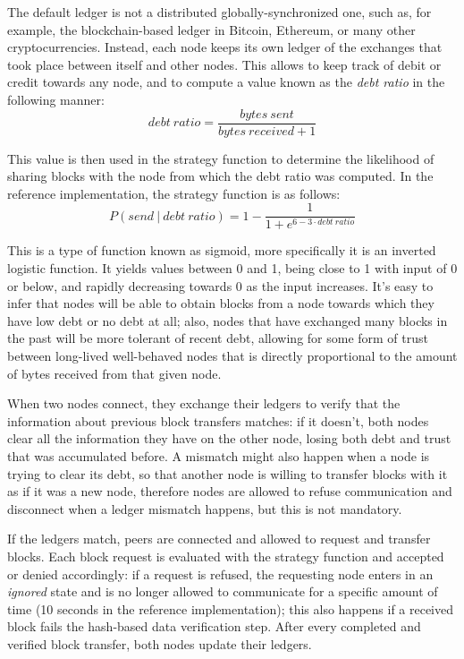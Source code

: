 \documentclass[mscthesis]{usiinfthesis}
\begin{document}
The default ledger is not a distributed globally-synchronized one, such as, for example, the blockchain-based ledger in Bitcoin, Ethereum, or many other cryptocurrencies. Instead, each node keeps its own ledger of the exchanges that took place between itself and other nodes. This allows to keep track of debit or credit towards any node, and to compute a value known as the \textit{debt ratio} in the following manner:
$$ \mathit{debt~ratio} = \frac{\mathit{bytes~sent}}{\mathit{bytes~received} + 1} $$

This value is then used in the strategy function to determine the likelihood of sharing blocks with the node from which the debt ratio was computed. In the reference implementation, the strategy function is as follows:
$$ P\left( \mathit{send}~|~\mathit{debt~ratio} \right) = 1 - \frac{1}{1 + e^{6 - 3\cdot\mathit{debt~ratio}}} $$

This is a type of function known as sigmoid, more specifically it is an inverted logistic function. It yields values between 0 and 1, being close to 1 with input of 0 or below, and rapidly decreasing towards 0 as the input increases. %
It's easy to infer that nodes will be able to obtain blocks from a node towards which they have low debt or no debt at all; also, nodes that have exchanged many blocks in the past will be more tolerant of recent debt, allowing for some form of trust between long-lived well-behaved nodes that is directly proportional to the amount of bytes received from that given node.

When two nodes connect, they exchange their ledgers to verify that the information about previous block transfers matches: if it doesn't, both nodes clear all the information they have on the other node, losing both debt and trust that was accumulated before. A mismatch might also happen when a node is trying to clear its debt, so that another node is willing to transfer blocks with it as if it was a new node, therefore nodes are allowed to refuse communication and disconnect when a ledger mismatch happens, but this is not mandatory.

If the ledgers match, peers are connected and allowed to request and transfer blocks. Each block request is evaluated with the strategy function and accepted or denied accordingly: if a request is refused, the requesting node enters in an \textit{ignored} state and is no longer allowed to communicate for a specific amount of time (10 seconds in the reference implementation); this also happens if a received block fails the hash-based data verification step. After every completed and verified block transfer, both nodes update their ledgers.
\end{document}
